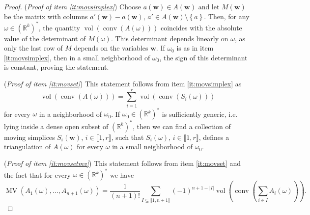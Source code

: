 \documentclass[a4paper]{article}
\theoremstyle{remark}
\newcommand{\set}[1]{\left\{#1\right\}}
\def\RR{\mathbb{R}}
\newcommand{\irng}[1]{\llbracket #1 \rrbracket}
\DeclareMathOperator{\mv}{MV}
\DeclareMathOperator{\vol}{vol}
\DeclareMathOperator{\Conv}{conv}
\begin{document}
\begin{proof}
  (\textit{Proof of item \ref{it:movsimplex}}) Choose
  $a(\mathbf{w})\in A(\mathbf{w})$ and let $M(\mathbf{w})$ be the matrix
  with columns $a'(\mathbf{w}) - a(\mathbf{w})$,
  $a'\in A(\mathbf{w})\setminus \set{a}$. Then, for any
  $\omega \in (\RR^k)^{*}$, the quantity $\vol(\Conv(A(\omega)))$ coincides with
  the absolute value of the determinant of $M(\omega)$.  This determinant
  depends linearly on $\omega$, as only the last row of $M$ depends on the
  variables $\mathbf{w}$. If $\omega_0$ is as in item \ref{it:movsimplex},
  then in a small neighborhood of $\omega_0$, the sign of this determinant
  is constant, proving the statement.

  (\textit{Proof of item \ref{it:movset}}) This statement follows from item
  \ref{it:movsimplex} as
  \[\vol(\Conv(A(\omega))) = \sum_{i=1}^r \vol(\Conv(S_i(\omega)))\]
  for every $\omega$ in a neighborhood of $\omega_0$. If
  $\omega_0\in (\RR^k)^*$ is sufficiently generic, i.e. lying inside a dense
  open subset of $(\RR^k)^{*}$, then we can find a collection of
  moving simplices $S_i(\mathbf{w})$, $i\in \irng{1,r}$, such that
  $S_i(\omega)$, $i\in \irng{1,r}$, defines a triangulation of
  $A(\omega)$ for every $\omega$ in a small neighborhood of $\omega_0$.

  (\textit{Proof of item \ref{it:movsetmv}}) This statement follows from item \ref{it:movset} and the fact that
  for every $\omega\in (\RR^k)^{*}$ we have
  \[\mv(A_1(\omega),\ldots, A_{n+1}(\omega)) = \frac{1}{(n+1)!}\sum_{I\subseteq
      \irng{1,n+1}}(-1)^{n+1-|I|}\vol(\Conv(\sum_{i\in I}A_{i}(\omega))).\]
\end{proof}
\end{document}
